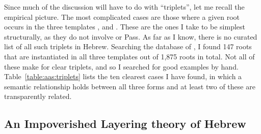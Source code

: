\begin{exe}
\begin{xlist}
\begin{exe}
\begin{exe}
\begin{xlist}
\begin{exe}
\begin{exe}
\begin{exe}
\begin{exe}
\begin{exe}
\begin{xlist}
\begin{exe}
Since much of the discussion will have to do with ``triplets'', let me recall the empirical picture. The most complicated cases are those where a given root occurs in the three templates {\tkal}, {\tnif} and {\thif}. These are the ones I take to be simplest structurally, as they do not involve {\va} or Pass. As far as I know, there is no curated list of all such triplets in Hebrew. Searching the database of \cite{ehrenfeld12}, I found 147 roots that are instantiated in all three templates out of 1,875 roots in total. Not all of these make for clear triplets, and so I searched for good examples by hand. Table~\ref{table:aas:triplets} lists the ten clearest cases I have found, in which a semantic relationship holds between all three forms and at least two of these are transparently related.
\begin{table}
		\caption{Derivational triplets in Hebrew.}
	\label{table:aas:triplets} 
\end{table}

	\subsection{An Impoverished Layering theory of Hebrew} \label{aas:jim:pros}

\end{exe}
\end{xlist}
\end{exe}
\end{exe}
\end{exe}
\end{exe}
\end{exe}
\end{xlist}
\end{exe}
\end{exe}
\end{xlist}
\end{exe}
